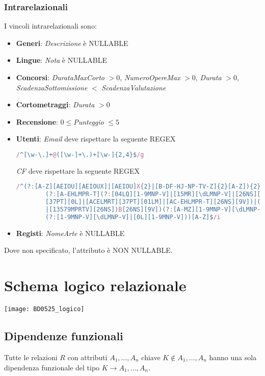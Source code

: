 \subsubsection{Intrarelazionali}
I vincoli intrarelazionali sono:
\begin{itemize}
	\item \textbf{Generi}: \textit{Descrizione} è NULLABLE
	\item \textbf{Lingue}: \textit{Nota} è NULLABLE
	\item \textbf{Concorsi}: \textit{DurataMaxCorto} $> 0$, \textit{NumeroOpereMax} $>0$, \textit{Durata} $>0$, \textit{ScadenzaSottomissione} $<$ \textit{ScadenzaValutazione}
	\item \textbf{Cortometraggi}: \textit{Durata} $>0$
	\item \textbf{Recensione}: $0\leq$\textit{Punteggio} $\leq 5$
	\item \textbf{Utenti}: \textit{Email} deve rispettare la seguente REGEX
	\begin{lstlisting}[language=Javascript]
		/^[\w-\.]+@([\w-]+\.)+[\w-]{2,4}$/g
	\end{lstlisting}
	\textit{CF} deve rispettare la seguente REGEX
	\begin{lstlisting}[language=Javascript]
		/^(?:[A-Z][AEIOU][AEIOUX]|[AEIOU]X{2}|[B-DF-HJ-NP-TV-Z]{2}[A-Z]){2}(?:[\dLMNP-V]{2}
		(?:[A-EHLMPR-T](?:[04LQ][1-9MNP-V]|[15MR][\dLMNP-V]|[26NS][0-8LMNP-U])|[DHPS]
		[37PT][0L]|[ACELMRT][37PT][01LM]|[AC-EHLMPR-T][26NS][9V])|(?:[02468LNQSU][048LQU]
		|[13579MPRTV][26NS])B[26NS][9V])(?:[A-MZ][1-9MNP-V][\dLMNP-V]{2}|[A-M][0L]
		(?:[1-9MNP-V][\dLMNP-V]|[0L][1-9MNP-V]))[A-Z]$/i
	\end{lstlisting}
	\item \textbf{Registi}: \textit{NomeArte} è NULLABLE
\end{itemize}
Dove non specificato, l'attributo è NON NULLABLE.

\newpage
\section{Schema logico relazionale}
\begin{center}
	\texttt{[image: BD0525\_logico]}
\end{center}

\subsection{Dipendenze funzionali}
Tutte le relazioni $R$ con attributi $A_1, \ldots, A_n$ chiave $K \notin A_1, \ldots, A_n$ hanno una sola dipendenza funzionale del tipo $K \to A_1, \ldots, A_n$.


